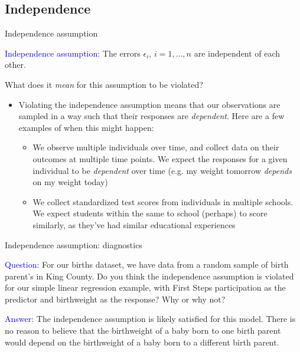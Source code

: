 \documentclass[10pt,t]{beamer}
\begin{document}
\subsection{Independence}

\begin{frame}{Independence assumption}
	
	\vspace{-5 mm}
\textcolor{blue}{Independence assumption:} The errors $\epsilon_i$, $i = 1, \dots, n$ are independent of each other.

\vspace{0.3cm}

What does it \textit{mean} for this assumption to be violated?

\vspace{0.3cm}

\begin{itemize}
	\item[] Violating the independence assumption means that our observations are sampled in a way such that their responses are \textit{dependent}. Here are a few examples of when this might happen:
	\begin{itemize}
		\item We observe multiple individuals over time, and collect data on their outcomes at multiple time points. We expect the responses for a given individual to be \textit{dependent} over time (e.g. my weight tomorrow \textit{depends} on my weight today)
		\medskip
		\item We collect standardized test scores from individuals in multiple schools. We expect students within the same to school (perhaps) to score similarly, as they've had similar educational experiences
	\end{itemize}
\end{itemize}
\end{frame}

\begin{frame}{Independence assumption: diagnostics}


\textcolor{blue}{Question:} For our births dataset, we have data from a random sample of birth parent's in King County. Do you think the independence assumption is violated for our simple linear regression example, with First Steps participation as the predictor and birthweight as the response? Why or why not? \pause

\vspace{0.3cm}

\textcolor{blue}{Answer:} The independence assumption is likely satisfied for this model. There is no reason to believe that the birthweight of a baby born to one birth parent would depend on the birthweight of a baby born to a different birth parent.

\end{frame}
\end{document}
